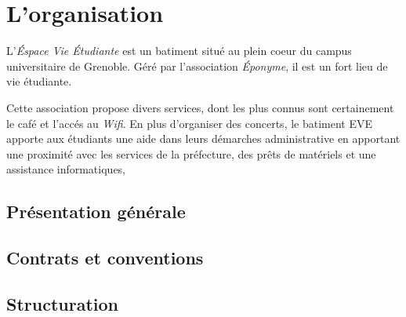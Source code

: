 \section{L'organisation}
L'{\it Éspace Vie Étudiante} est un batiment situé au plein coeur du campus 
universitaire de Grenoble. Géré par l'association {\it Éponyme}, il est un fort 
lieu de vie étudiante.

Cette association propose divers services, dont les plus connus sont certainement
le café et l'accés au {\it Wifi}. En plus d'organiser des concerts, le batiment EVE
apporte aux étudiants une aide dans leurs démarches administrative en apportant une 
proximité avec les services de la préfecture, des prêts de matériels et une assistance
 informatiques,

\subsection{Présentation générale}
\label{presentation}
\subsection{Contrats et conventions}
\label{contrats}
\subsection{Structuration}
\label{structuration}
